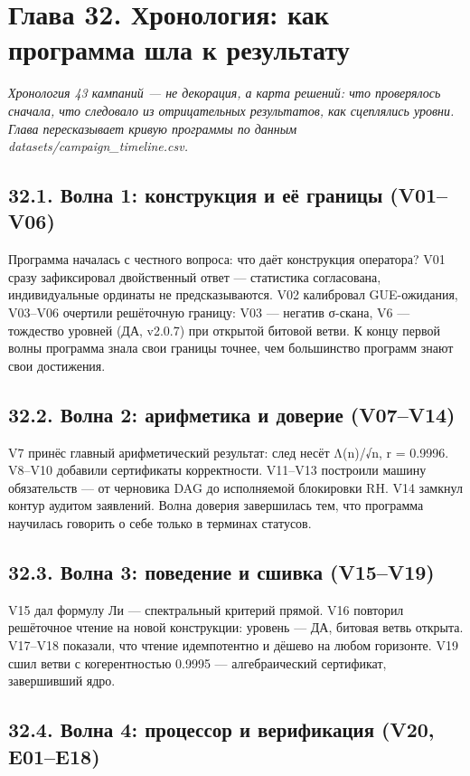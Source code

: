 \documentclass[11pt,a4paper]{article}
\begin{document}
\section{Глава 32. Хронология: как программа шла к результату}

\noindent\textit{\color{copper}Хронология 43 кампаний — не декорация, а карта решений: что проверялось сначала, что следовало из отрицательных результатов, как сцеплялись уровни. Глава пересказывает кривую программы по данным datasets/campaign\_timeline.csv.}

\subsection{32.1. Волна 1: конструкция и её границы (V01–V06)}

Программа началась с честного вопроса: что даёт конструкция оператора? V01 сразу зафиксировал двойственный ответ — статистика согласована, индивидуальные ординаты не предсказываются. V02 калибровал GUE-ожидания, V03–V06 очертили решёточную границу: V03 — негатив σ-скана, V6 — тождество уровней (ДА, v2.0.7) при открытой битовой ветви. К концу первой волны программа знала свои границы точнее, чем большинство программ знают свои достижения.

\subsection{32.2. Волна 2: арифметика и доверие (V07–V14)}

V7 принёс главный арифметический результат: след несёт Λ(n)/√n, r = 0.9996. V8–V10 добавили сертификаты корректности. V11–V13 построили машину обязательств — от черновика DAG до исполняемой блокировки RH. V14 замкнул контур аудитом заявлений. Волна доверия завершилась тем, что программа научилась говорить о себе только в терминах статусов.

\subsection{32.3. Волна 3: поведение и сшивка (V15–V19)}

V15 дал формулу Ли — спектральный критерий прямой. V16 повторил решёточное чтение на новой конструкции: уровень — ДА, битовая ветвь открыта. V17–V18 показали, что чтение идемпотентно и дёшево на любом горизонте. V19 сшил ветви с когерентностью 0.9995 — алгебраический сертификат, завершивший ядро.

\subsection{32.4. Волна 4: процессор и верификация (V20, E01–E18)}
\end{document}
